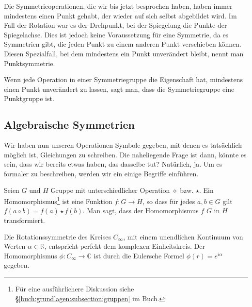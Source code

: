 
Die Symmetrieoperationen, die wir bis jetzt besprochen haben, haben immer
mindestens einen Punkt gehabt, der wieder auf sich selbst abgebildet wird. Im
Fall der Rotation war es der Drehpunkt, bei der Spiegelung die Punkte der
Spiegelachse. Dies ist jedoch keine Voraussetzung für eine Symmetrie, da es
Symmetrien gibt, die jeden Punkt zu einem anderen Punkt verschieben können.
Diesen Spezialfall, bei dem mindestens ein Punkt unverändert bleibt, nennt man
Punktsymmetrie.
\begin{definition}[Punktgruppe]
	Wenn jede Operation in einer Symmetriegruppe die Eigenschaft hat, mindestens
	einen Punkt unverändert zu lassen, sagt man, dass die Symmetriegruppe eine
	Punktgruppe ist.
\end{definition}

\subsection{Algebraische Symmetrien}
Wir haben nun unseren Operationen Symbole gegeben, mit denen es tatsächlich
möglich ist, Gleichungen zu schreiben. Die naheliegende Frage ist dann, könnte
es sein, dass wir bereits etwas haben, das dasselbe tut?  Natürlich, ja.
Um es formaler zu beschreiben, werden wir ein einige Begriffe einführen.
\begin{definition}[Gruppenhomomorphismus]
	Seien \(G\) und \(H\) Gruppe mit unterschiedlicher Operation \(\diamond\)
	bzw.  \(\star\). Ein Homomorphismus\footnote{ Für eine ausführlichere
	Diskussion siehe \S\ref{buch:grundlagen:subsection:gruppen} im Buch.} ist
	eine Funktion \(f: G \to H\), so dass für jedes \(a, b \in G\) gilt
	\(f(a\diamond b) = f(a) \star f(b)\).  Man sagt, dass der Homomorphismus
	\(f\) \(G\) in \(H\) transformiert.
\end{definition}
\begin{beispiel}
	Die Rotationssymmetrie des Kreises \(C_\infty\), mit einem unendlichen
	Kontinuum von Werten \(\alpha \in \mathbb{R}\), entspricht perfekt dem
	komplexen Einheitskreis. Der Homomorphismus \(\phi: C_\infty \to \mathbb{C}\)
	ist durch die Eulersche Formel \(\phi(r) = e^{i\alpha}\) gegeben.
\end{beispiel}

